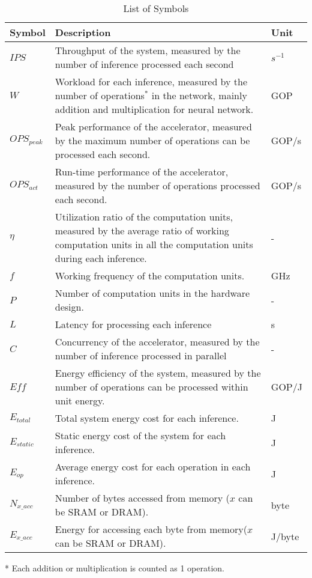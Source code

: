 \begin{table}[htbp]
    \centering
    \begin{threeparttable}
        \caption{List of Symbols}\label{tab:symbol}%
        \begin{tabular}{l|p{}|l} \toprule
        Symbol & Description & Unit \\ \hline
        $IPS$   & Throughput of the system, measured by the number of inference processed each second & $s^{-1}$ \\ \hline
        $W$     & Workload for each inference, measured by the number of operations$^*$ in the network, mainly addition and multiplication for neural network. & GOP \\ \hline
        $OPS_{peak}$ & Peak performance of the accelerator, measured by the maximum number of operations can be processed each second. & GOP/s \\ \hline
        $OPS_{act}$ & Run-time performance of the accelerator, measured by the number of operations processed each second. & GOP/s \\ \hline
        $\eta$   & Utilization ratio of the computation units, measured by the average ratio of working computation units in all the computation units during each inference. & - \\ \hline
        $f$ & Working frequency of the computation units. & GHz \\ \hline
        $P$ & Number of computation units in the hardware design. & - \\ \hline
        $L$ & Latency for processing each inference & s \\ \hline
        $C$ & Concurrency of the accelerator, measured by the number of inference processed in parallel & - \\ \hline 
        $Eff$   & Energy efficiency of the system, measured by the number of operations can be processed within unit energy. & GOP/J \\ \hline
        $E_{total}$ & Total system energy cost for each inference. & J \\ \hline 
        $E_{static}$ & Static energy cost of the system for each inference. & J \\ \hline
        $E_{op}$ & Average energy cost for each operation in each inference. & J \\ \hline
        $N_{x\_acc}$ & Number of bytes accessed from memory ($x$ can be SRAM or DRAM). & byte \\ \hline
        $E_{x\_acc}$ & Energy for accessing each byte from memory($x$ can be SRAM or DRAM). & J/byte \\ 
        \bottomrule
        \end{tabular}%
        \begin{tablenotes}
            \item[*] Each addition or multiplication is counted as 1 operation.
        \end{tablenotes}
    \end{threeparttable}
\end{table}%
